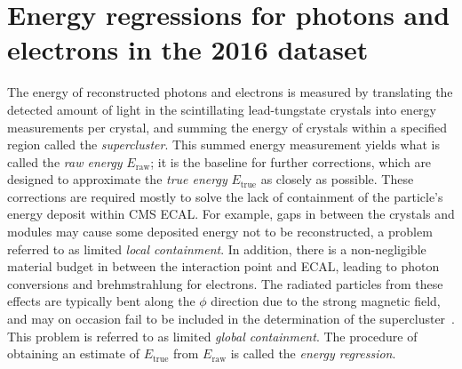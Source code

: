 \clearpage
\section{Energy regressions for photons and electrons in the 2016 dataset}
\label{app:regression}

\newcommand{\Eraw}{\ensuremath{E_\text{raw}}\xspace}
\newcommand{\Etrue}{\ensuremath{E_\text{true}}\xspace}
\newcommand{\Ecorr}{\ensuremath{E_\text{corr}}\xspace}

The energy of reconstructed photons and electrons is measured by translating the detected amount of light in the scintillating lead-tungstate crystals into energy measurements per crystal, and summing the energy of crystals within a specified region called the \textit{supercluster}.
% 
This summed energy measurement yields what is called the \textit{raw energy} $\Eraw$; it is the baseline for further corrections, which are designed to approximate the \textit{true energy} $\Etrue$ as closely as possible.
% 
These corrections are required mostly to solve the lack of containment of the particle's energy deposit within CMS ECAL.
% 
For example, gaps in between the crystals and modules may cause some deposited energy not to be reconstructed, a problem referred to as limited \textit{local containment}.
% 
In addition, there is a non-negligible material budget in between the interaction point and ECAL, leading to photon conversions and brehmstrahlung for electrons.
% 
The radiated particles from these effects are typically bent along the $\phi$ direction due to the strong magnetic field, and may on occasion fail to be included in the determination of the supercluster~\cite{Chatrchyan:2013dga}.
% 
This problem is referred to as limited \textit{global containment}.
% 
The procedure of obtaining an estimate of $\Etrue$ from $\Eraw$ is called the \textit{energy regression}.


